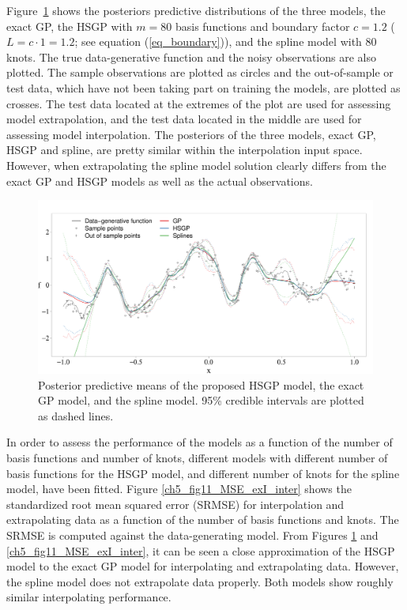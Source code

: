 \documentclass[onecolumn,a4paper,11pt]{article}
\begin{document}
Figure~\ref{ch5_fig10_Posteriors_exI} shows the posteriors predictive distributions of the three models, the exact GP, the HSGP with $m=80$ basis functions and boundary factor $c=1.2$ ($L=c\cdot 1= 1.2$; see equation (\ref{eq_boundary})), and the spline model with 80 knots. The true data-generative function and the noisy observations are also plotted. The sample observations are plotted as circles and the out-of-sample or test data, which have not been taking part on training the models, are plotted as crosses. The test data located at the extremes of the plot are used for assessing model extrapolation, and the test data located in the middle are used for assessing model interpolation. The posteriors of the three models, exact GP, HSGP and spline, are pretty similar within the interpolation input space. However, when extrapolating the spline model solution clearly differs from the exact GP and HSGP models as well as the actual observations. 

\begin{figure}
\centering
\includegraphics[width=\textwidth]{ch5_fig10_Posteriors_exI.pdf}
\caption{Posterior predictive means of the proposed HSGP model, the exact GP model, and the spline model. 95\% credible intervals are plotted as dashed lines.}
  \label{ch5_fig10_Posteriors_exI}
\end{figure}

In order to assess the performance of the models as a function of the number of basis functions and number of knots, different models with different number of basis functions for the HSGP model, and different number of knots for the spline model, have been fitted. Figure \ref{ch5_fig11_MSE_exI_inter} shows the standardized root mean squared error (SRMSE) for interpolation and extrapolating data as a function of the number of basis functions and knots. The SRMSE is computed against the data-generating model. From Figures \ref{ch5_fig10_Posteriors_exI} and \ref{ch5_fig11_MSE_exI_inter}, it can be seen a close approximation of the HSGP model to the exact GP model for interpolating and extrapolating data. However, the spline model does not extrapolate data properly. Both models show roughly similar interpolating performance. 
\end{document}
